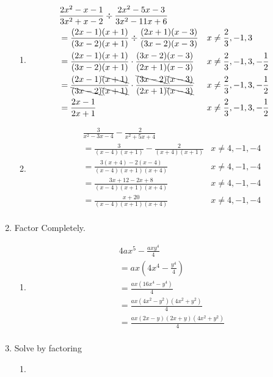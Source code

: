 \documentclass[paper=a4, fontsize=11pt]{scrartcl}
\begin{document}
\begin{enumerate}
\begin{enumerate}
        \item \begin{align*}
            &\frac{2x^2-x-1}{3x^2+x-2}\div\frac{2x^2-5x-3}{3x^2-11x+6}\\
            &=\frac{(2x-1)(x+1)}{(3x-2)(x+1)}\div\frac{(2x+1)(x-3)}{(3x-2)(x-3)}&x&\neq\frac{2}{3},-1,3\\
            &=\frac{(2x-1)(x+1)}{(3x-2)(x+1)}\cdot \frac{(3x-2)(x-3)}{(2x+1)(x-3)}&x&\neq\frac{2}{3},-1,3,-\frac{1}{2}\\
            &=\frac{(2x-1)\bcancel{(x+1)}}{\bcancel{(3x-2)}\bcancel{(x+1)}}\cdot \frac{\bcancel{(3x-2)}\bcancel{(x-3)}}{(2x+1)\bcancel{(x-3)}}&x&\neq\frac{2}{3},-1,3,-\frac{1}{2}\\
            &=\frac{2x-1}{2x+1}&x&\neq\frac{2}{3},-1,3,-\frac{1}{2}\\
        \end{align*}
        \item \begin{align*}
            &\frac{3}{x^2-3x-4}-\frac{2}{x^2+5x+4}\\
            &=\frac{3}{(x-4)(x+1)}-\frac{2}{(x+4)(x+1)}&x\neq4,-1,-4\\
            &=\frac{3(x+4)-2(x-4)}{(x-4)(x+1)(x+4)}&x\neq4,-1,-4\\
            &=\frac{3x+12-2x+8}{(x-4)(x+1)(x+4)}&x\neq4,-1,-4\\
            &=\frac{x+20}{(x-4)(x+1)(x+4)}&x\neq4,-1,-4\\
        \end{align*}
    \end{enumerate}
    \item Factor Completely.
    \begin{enumerate}
        \item \begin{align*}
            &4ax^5-\frac{axy^4}{4}\\
            &=ax(4x^4-\frac{y^4}{4})\\
            &=\frac{ax(16x^4-y^4)}{4}\\
            &=\frac{ax(4x^2-y^2)(4x^2+y^2)}{4}\\
            &=\frac{ax(2x-y)(2x+y)(4x^2+y^2)}{4}\\
        \end{align*}
    \end{enumerate}
    \item Solve by factoring
    \begin{enumerate}
        \item \begin{align*}

\end{align*}
\end{enumerate}
\end{enumerate}
\end{document}
